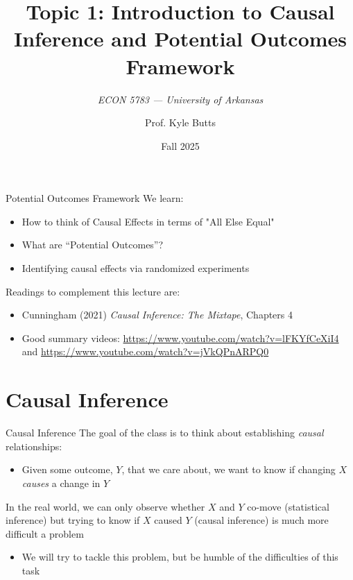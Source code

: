 \documentclass[aspectratio=169,t,11pt,table]{beamer}
\title{Topic 1: Introduction to Causal Inference and Potential Outcomes Framework}
\subtitle{\it  ECON 5783 — University of Arkansas}
\date{Fall 2025}
\author{Prof. Kyle Butts}
\begin{document}
\begin{frame}
  \maketitle

\end{frame}

\begin{frame}{Potential Outcomes Framework}
  We learn:
  \begin{itemize}
    \item How to think of Causal Effects in terms of "All Else Equal"
    \item What are ``Potential Outcomes''?
    \item Identifying causal effects via randomized experiments
  \end{itemize}

  \bigskip
  Readings to complement this lecture are:
  \begin{itemize}
    \item Cunningham (2021) \emph{Causal Inference: The Mixtape}, Chapters 4
    
    \item Good summary videos: \url{https://www.youtube.com/watch?v=lFKYfCeXiI4} and \url{https://www.youtube.com/watch?v=jVkQPnARPQ0}
  \end{itemize}
\end{frame}

\section{Causal Inference}

\begin{frame}{Causal Inference}
  The goal of the class is to think about establishing \emph{causal} relationships:
  \begin{itemize}
    \item Given some outcome, $Y$, that we care about, we want to know if changing $X$ \emph{causes} a change in $Y$
  \end{itemize}
    
  \pause
  \bigskip
  In the real world, we can only observe whether $X$ and $Y$ co-move (\alert{statistical inference}) but trying to know if $X$ caused $Y$ (\alert{causal inference}) is much more difficult a problem
  \begin{itemize}
    \item We will try to tackle this problem, but be humble of the difficulties of this task
  \end{itemize}
\end{frame}
\end{document}
